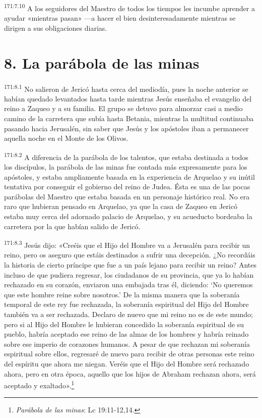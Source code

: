 \par 
\textsuperscript{171:7.10} A los seguidores del Maestro de todos los tiempos les incumbe aprender a ayudar «mientras pasan» ---a hacer el bien desinteresadamente mientras se dirigen a sus obligaciones diarias.

\section*{8. La parábola de las minas}
\par 
\textsuperscript{171:8.1} No salieron de Jericó hasta cerca del mediodía, pues la noche anterior se habían quedado levantados hasta tarde mientras Jesús enseñaba el evangelio del reino a Zaqueo y a su familia. El grupo se detuvo para almorzar casi a medio camino de la carretera que subía hasta Betania, mientras la multitud continuaba pasando hacia Jerusalén, sin saber que Jesús y los apóstoles iban a permanecer aquella noche en el Monte de los Olivos.

\par 
\textsuperscript{171:8.2} A diferencia de la parábola de los talentos, que estaba destinada a todos los discípulos, la parábola de las minas fue contada más expresamente para los apóstoles, y estaba ampliamente basada en la experiencia de Arquelao y su inútil tentativa por conseguir el gobierno del reino de Judea. Ésta es una de las pocas parábolas del Maestro que estaba basada en un personaje histórico real. No era raro que hubieran pensado en Arquelao, ya que la casa de Zaqueo en Jericó estaba muy cerca del adornado palacio de Arquelao, y su acueducto bordeaba la carretera por la que habían salido de Jericó.

\par 
\textsuperscript{171:8.3} Jesús dijo: «Creéis que el Hijo del Hombre va a Jerusalén para recibir un reino, pero os aseguro que estáis destinados a sufrir una decepción. ¿No recordáis la historia de cierto príncipe que fue a un país lejano para recibir un reino? Antes incluso de que pudiera regresar, los ciudadanos de su provincia, que ya lo habían rechazado en su corazón, enviaron una embajada tras él, diciendo: `No queremos que este hombre reine sobre nosotros.' De la misma manera que la soberanía temporal de este rey fue rechazada, la soberanía espiritual del Hijo del Hombre también va a ser rechazada. Declaro de nuevo que mi reino no es de este mundo; pero si al Hijo del Hombre le hubieran concedido la soberanía espiritual de su pueblo, habría aceptado ese reino de las almas de los hombres y habría reinado sobre ese imperio de corazones humanos. A pesar de que rechazan mi soberanía espiritual sobre ellos, regresaré de nuevo para recibir de otras personas este reino del espíritu que ahora me niegan. Veréis que el Hijo del Hombre será rechazado ahora, pero en otra época, aquello que los hijos de Abraham rechazan ahora, será aceptado y exaltado».\footnote{\textit{Parábola de las minas}: Lc 19:11-12,14.}

